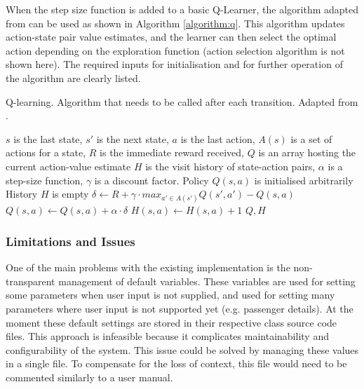 When the step size function is added to a basic Q-Learner, the algorithm
adapted from \textcite{Sutton1998ai+reinforcement} can be used as shown in
Algorithm \ref{algorithm:q}. This algorithm updates action-state pair value
estimates, and the learner can then select the optimal action depending on the
exploration function (action selection algorithm is not shown here). The
required inputs for initialisation and for further operation of the algorithm
are clearly listed.

\begin{algorithm}
  \caption{
  Q-learning. Algorithm that needs to be called after each transition. 
  Adapted from \textcite{Sutton1998ai+reinforcement}. 
  \label{algorithm:q}}

  \begin{algorithmic}[1]
    \Require
      \Statex $s$ is the last state,
      \Statex $s'$ is the next state,
      \Statex $a$ is the last action,
      \Statex $A(s)$ is a set of actions for a state,
      \Statex $R$ is the immediate reward received,
      \Statex $Q$ is an array hosting the current action-value estimate
      \Statex $H$ is the visit history of state-action pairs,
      \Statex $\alpha$ is a step-size function,
      \Statex $\gamma$ is a discount factor.
      \Statex Policy $Q(s, a)$ is initialised arbitrarily
      \Statex History $H$ is empty
      \State $\delta \gets R + 
              \gamma \cdot max_{a' \in A(s')} Q(s', a') - Q(s, a)$
      \State $Q(s, a) \gets Q(s, a) + \alpha \cdot \delta$
      \State $H(s, a) \gets H(s, a) + 1$
      \State \Return $Q, H$
    \EndFunction
  \end{algorithmic}
\end{algorithm}


\subsubsection{Limitations and Issues}

One of the main problems with the existing implementation is the non-
transparent management of default variables. These variables are used for
setting some parameters when user input is not supplied, and used for setting
many parameters where user input is not supported yet (e.g. passenger details).
At the moment these default settings are stored in their respective class
source code files. This approach is infeasible because it complicates
maintainability and configurability of the system. This issue could be solved
by managing these values in a single file. To compensate for the loss of
context, this file would need to be commented similarly to a user manual.

